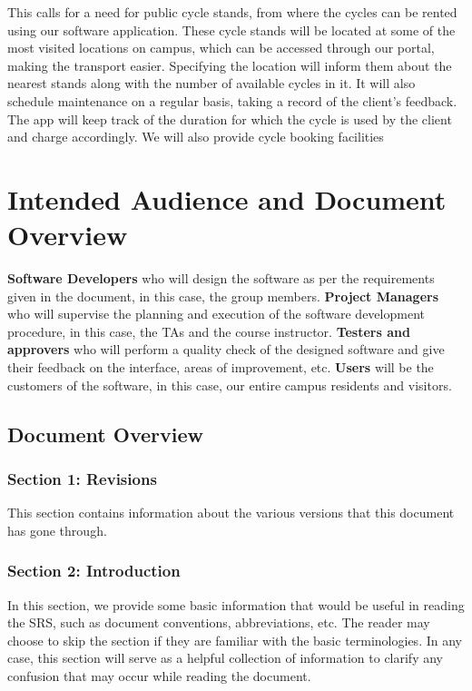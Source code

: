 \documentclass{scrreprt}
\begin{document}
This calls for a need for public cycle stands, from where the cycles can be rented using our  software application. These cycle stands will be located at some of the most visited locations on campus, which can be accessed through our portal, making the transport easier. Specifying the location will inform them about the nearest stands along with the number of available cycles in it.
It will also schedule maintenance on a regular basis, taking a record of the client’s feedback. The app will keep track of the duration for which the cycle is used by the client and charge accordingly. We will also provide cycle booking facilities

\section{Intended Audience and Document Overview}
\textbf{Software Developers} who will design the software as per the requirements given in the document, in this case, the group members. \textbf{Project Managers} who will supervise the planning and execution of the software development procedure, in this case, the TAs and the course instructor. \textbf{Testers and approvers} who will perform a quality check of the designed software and give their feedback on the interface, areas of improvement, etc. \textbf{Users} will be the customers of the software, in this case, our entire campus residents and visitors.

\subsection*{Document Overview}
\subsubsection*{Section 1: Revisions}
This section contains information about the various versions that this document has gone through.

\subsubsection*{Section 2: Introduction}
In this section, we provide some basic information that would be useful in reading the SRS, such as document conventions, abbreviations, etc. The reader may choose to skip the section if they are familiar with the basic terminologies. In any case, this section will serve as a helpful collection of information to clarify any confusion that may occur while reading the document.
\end{document}
